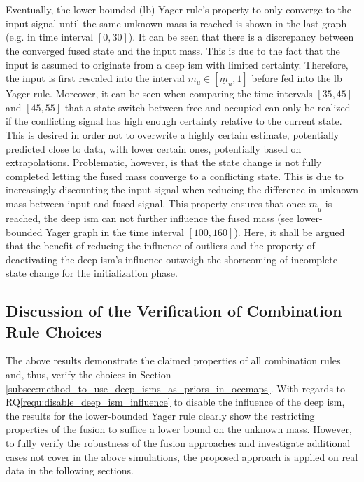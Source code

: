 \\\\
Eventually, the lower-bounded (lb) Yager rule's property to only converge to the input signal until the same unknown mass is reached is shown in the last graph (e.g. in time interval $[0, 30]$). It can be seen that there is a discrepancy between the converged fused state and the input mass. This is due to the fact that the input is assumed to originate from a deep \gls{ism} with limited certainty. Therefore, the input is first rescaled into the interval $m_u \in [\underline{m}_u, 1]$ before fed into the lb Yager rule. Moreover, it can be seen when comparing the time intervals $[35, 45]$ and $[45, 55]$ that a state switch between free and occupied can only be realized if the conflicting signal has high enough certainty relative to the current state. This is desired in order not to overwrite a highly certain estimate, potentially predicted close to data, with lower certain ones, potentially based on extrapolations. Problematic, however, is that the state change is not fully completed letting the fused mass converge to a conflicting state. This is due to increasingly discounting the input signal when reducing the difference in unknown mass between input and fused signal. This property ensures that once $\underline{m}_u$ is reached, the deep \gls{ism} can not further influence the fused mass (see lower-bounded Yager graph in the time interval $[100, 160]$). Here, it shall be argued that the benefit of reducing the influence of outliers and the property of deactivating the deep \gls{ism}'s influence outweigh the shortcoming of incomplete state change for the initialization phase. 
%
\subsection{Discussion of the Verification of Combination Rule Choices}
\label{subsec:discussion_choice_comb_rule}
The above results demonstrate the claimed properties of all combination rules and, thus, verify the choices in Section \ref{subsec:method_to_use_deep_isms_as_priors_in_occmaps}. With regards to RQ\ref{requ:disable_deep_ism_influence} to disable the influence of the deep \gls{ism}, the results for the lower-bounded Yager rule clearly show the restricting properties of the fusion to suffice a lower bound on the unknown mass. However, to fully verify the robustness of the fusion approaches and investigate additional cases not cover in the above simulations, the proposed approach is applied on real data in the following sections.
%
